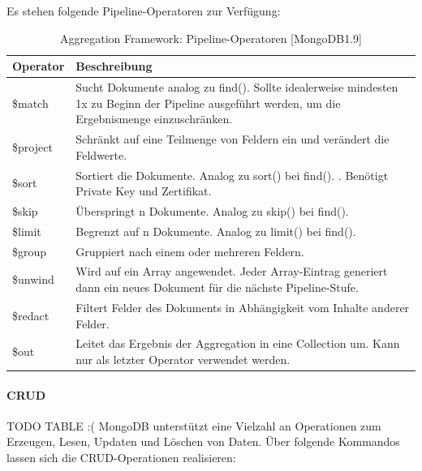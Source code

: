 Es stehen folgende Pipeline-Operatoren zur Verfügung:

 

\begin{table}[h]
\begin{center}
    \begin{tabular}{| l | p{14cm} |}
    \hline
    \textbf{Operator}  & \textbf{Beschreibung} \\ \hline
    \$match &Sucht Dokumente analog zu find(). Sollte idealerweise mindesten 1x zu Beginn der Pipeline ausgeführt werden, um die Ergebnismenge einzuschränken.\\
    
    \hline
    \$project & Schränkt auf eine Teilmenge von Feldern ein und verändert die Feldwerte.  \\
    
    \hline
	\$sort & Sortiert die Dokumente. Analog zu sort() bei find(). .\newline
	Benötigt Private Key und Zertifikat.  \\
	
    \hline    
    \$skip & Überspringt n Dokumente. Analog zu skip() bei find().  \\ 
    
    \hline    
    \$limit & Begrenzt auf n Dokumente. Analog zu limit() bei find().  \\
    \hline 
   \$group   &	Gruppiert nach einem oder mehreren Feldern. \\ 
     \hline 
\$unwind  &	Wird auf ein Array angewendet. Jeder Array-Eintrag generiert dann ein neues Dokument für die nächste Pipeline-Stufe.\\ 
\hline  
\$redact  &	Filtert Felder des Dokuments in Abhängigkeit vom Inhalte anderer Felder.\\ 
\hline  
\$out  &	Leitet das Ergebnis der Aggregation in eine Collection um. Kann nur als letzter Operator verwendet werden.  \\ 
    
    \hline
    \end{tabular}
\end{center}
\caption{Aggregation Framework: Pipeline-Operatoren [MongoDB1.9]}
\end{table}

\paragraph{CRUD} TODO TABLE :(
MongoDB unterstützt eine Vielzahl an Operationen zum Erzeugen, Lesen, Updaten und Löschen von Daten.
Über folgende Kommandos lassen sich die CRUD-Operationen realisieren:
\newline


